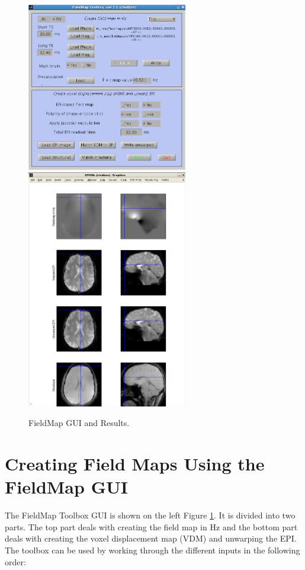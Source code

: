 \begin{figure}
\begin{center}
\includegraphics[width=70mm]{FieldMap/fieldmap_gui1}
\includegraphics[width=70mm]{FieldMap/fieldmap_results1}
\end{center}
\caption{FieldMap GUI and Results. \label{FM1}}
\end{figure}

\section{Creating Field Maps Using the FieldMap GUI}
The FieldMap Toolbox GUI is shown on the left Figure \ref{FM1}. It is divided into two parts. The top part deals with creating the field map in Hz and the bottom part deals with creating the voxel displacement map (VDM) and unwarping the EPI. The toolbox can be used by working through the different inputs in the following order:

